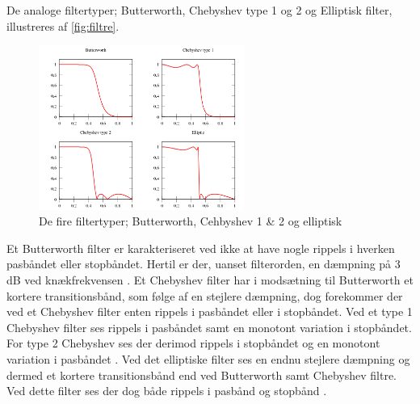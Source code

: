 De analoge filtertyper; Butterworth, Chebyshev type 1 og 2 og Elliptisk filter, illustreres af \autoref{fig:filtre}.

\begin{figure}[H]
\centering
\includegraphics[width=0.6\textwidth]{figures/filtre}
\caption{De fire filtertyper; Butterworth, Cehbyshev 1 \& 2 og elliptisk}
\label{fig:filtre}
\end{figure}

Et Butterworth filter er karakteriseret ved ikke at have nogle rippels i hverken pasbåndet eller stopbåndet. Hertil er der, uanset filterorden, en dæmpning på 3 dB ved knækfrekvensen \citep{nilsson2015}.
Et Chebyshev filter har i modsætning til Butterworth et kortere transitionsbånd, som følge af en stejlere dæmpning, dog forekommer der ved et Chebyshev filter enten rippels i pasbåndet eller i stopbåndet. Ved et type 1 Chebyshev filter ses rippels i pasbåndet samt en monotont variation i stopbåndet. For type 2 Chebyshev ses der derimod rippels i stopbåndet og en monotont variation i pasbåndet \citep{nilsson2015}. 
Ved det elliptiske filter ses en endnu stejlere dæmpning og dermed et kortere transitionsbånd end ved Butterworth samt Chebyshev filtre. Ved dette filter ses der dog både rippels i pasbånd og stopbånd \citep{nilsson2015}. 
